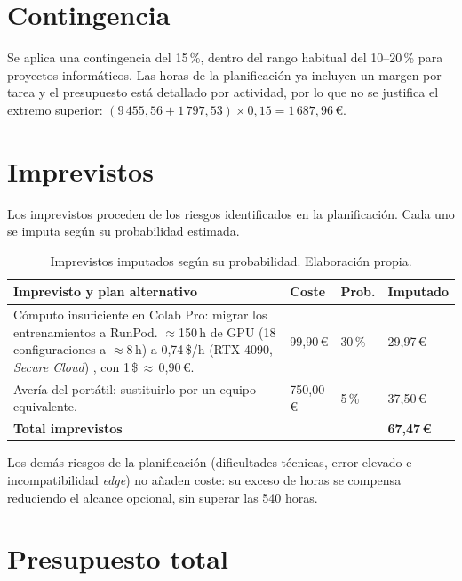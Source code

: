 \section{Contingencia}

Se aplica una contingencia del 15\,\%, dentro del rango habitual del 10--20\,\%
para proyectos informáticos. Las horas de la planificación ya incluyen un
margen por tarea y el presupuesto está detallado por actividad, por lo que no
se justifica el extremo superior:
$(9\,455{,}56 + 1\,797{,}53) \times 0{,}15 = 1\,687{,}96$\,€.

\section{Imprevistos}

Los imprevistos proceden de los riesgos identificados en la planificación. Cada
uno se imputa según su probabilidad estimada.

\begin{table}[H]
  \centering
  \small
  \begin{tabularx}{\textwidth}{YR{1.5cm}R{1.2cm}R{1.7cm}}
    \toprule
    \textbf{Imprevisto y plan alternativo} & \textbf{Coste} &
    \textbf{Prob.} & \textbf{Imputado} \\
    \midrule
    Cómputo insuficiente en Colab Pro: migrar los entrenamientos a RunPod.
    $\approx$150\,h de GPU (18 configuraciones a $\approx$8\,h) a 0,74\,\$/h
    (RTX 4090, \emph{Secure Cloud}) \citep{GPUCloudPricing}, con
    1\,\$\,$\approx$\,0,90\,€. & 99,90\,€ & 30\,\% & 29,97\,€ \\
    Avería del portátil: sustituirlo por un equipo equivalente. & 750,00\,€ &
    5\,\% & 37,50\,€ \\
    \midrule
    \textbf{Total imprevistos} & & & \textbf{67,47\,€} \\
    \bottomrule
  \end{tabularx}
  \caption[Imprevistos]{Imprevistos imputados según su probabilidad.
  Elaboración propia.}
  \label{tab:imprevistos}
\end{table}

Los demás riesgos de la planificación (dificultades técnicas, error elevado e
incompatibilidad \emph{edge}) no añaden coste: su exceso de horas se compensa
reduciendo el alcance opcional, sin superar las 540 horas.

\section{Presupuesto total}

